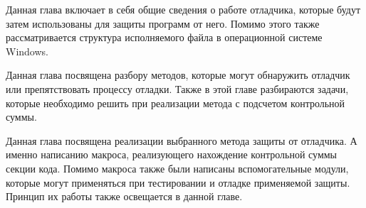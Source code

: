 %



  \newpage

  \tableofcontents
  \newpage

  Данная глава включает в себя общие сведения о работе отладчика, которые будут
  затем использованы для защиты программ от него. Помимо этого также
  рассматривается структура исполняемого файла в операционной системе Windows.
  
  
  
  
  

  Данная глава посвящена разбору методов, которые могут обнаружить отладчик или
  препятствовать процессу отладки. Также в этой главе разбираются задачи,
  которые необходимо решить при реализации метода с подсчетом контрольной суммы.
  
  
  
  
  

  Данная глава посвящена реализации выбранного метода защиты от отладчика. А
  именно написанию макроса, реализующего нахождение контрольной суммы секции
  кода. Помимо макроса также были написаны вспомогательные модули, которые
  могут применяться при тестировании и отладке применяемой защиты. Принцип их
  работы также освещается в данной главе.
  
  
  

  

